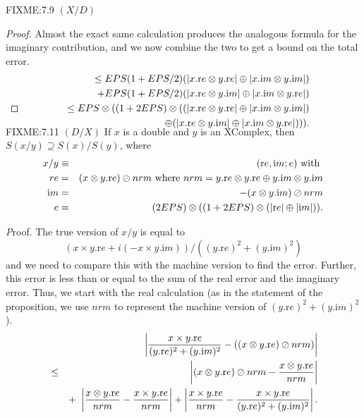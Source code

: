 \begin{definition}
\begin{proposition}{FIXME:7.9 $(X / D)$}
\begin{proof}{}
Almost the exact same calculation produces the analogous formula for the imaginary contribution, and we now combine the
two to get a bound on the total error.  
\begin{eqnarray*}
&&\le EPS (1 + EPS/2) (|x.{\mathrm re} \otimes y.{\mathrm re}| \oplus |x.{\mathrm im} \otimes y.{\mathrm im}|) \\
&&\quad +
EPS (1 + EPS/2) (|x.{\mathrm re} \otimes y.{\mathrm im}| \oplus |x.{\mathrm im} \otimes y.{\mathrm re}| )\\
&&\le EPS \otimes ((1 +
2EPS)\otimes((|x.{\mathrm re} \otimes y.{\mathrm re}| \oplus |x.{\mathrm im} \otimes y.{\mathrm im}| ) \\
&&\quad \oplus
(|x.{\mathrm re} \otimes y.{\mathrm im}| \oplus |x.{\mathrm im} \otimes y.{\mathrm re}| ))).
\\
\noalign{\vskip-36pt}
\end{eqnarray*}
\end{proof}

\begin{proposition}{FIXME:7.11 $(D / X)$}
If $x$ is a double and $y$ is an {\textrm XComplex,} then
$S(x / y) \supseteq S(x) / S(y)${\textrm ,} where
\begin{eqnarray*}
x  / y & \equiv& ({\mathrm re},{\mathrm im};e)\hbox{ with }\\
re& =& (x  \otimes y.{\mathrm re})\oslash nrm \hbox{ where $nrm = y.{\mathrm re} \otimes y.{\mathrm re} \oplus y.{\mathrm im} \otimes
y.{\mathrm im}$}
\\
{\mathrm im} &=& -(x  \otimes y.{\mathrm im}) \oslash nrm\\
e& =& (2EPS) \otimes ((1 +  2EPS)\otimes(|{\mathrm re}| \oplus |{\mathrm im}|)).
\end{eqnarray*}
\end{proposition}

{\textit Proof}.
The true version of $x/y$ is equal to  
$$(x \times y.{\mathrm re} + i (-x \times y.{\mathrm im}))/ ((y.{\mathrm re})^2 + (y.{\mathrm im})^2)$$ and we need to compare this with the
machine version to find the error.  Further, this error is less than or equal to the sum of the real error and the imaginary
error. Thus, we start with the real calculation (as in the statement of the proposition, we use $nrm$ to represent the
machine version of $(y.{\mathrm re})^2 + (y.{\mathrm im})^2$).
\begin{eqnarray*}
&&\hskip-36pt \left|{x \times y.{\mathrm re}  \over (y.{\mathrm re})^2 + (y.{\mathrm im})^2} - ((x \otimes y.{\mathrm re})\oslash
nrm)\right|\\
&
\le &\left|(x
\otimes y.{\mathrm re}) \oslash nrm - {x \otimes y.{\mathrm re} \over nrm}\right|\\
&& +\ \left|{x \otimes y.{\mathrm re} \over nrm} - {x
\times y.{\mathrm re}
\over nrm}\right| + \left|{x \times y.{\mathrm re} \over nrm} - 
{x \times y.{\mathrm re}  \over (y.{\mathrm re})^2 + (y.{\mathrm im})^2}\right|.
\end{eqnarray*}
 

\end{proposition}
\end{definition}
